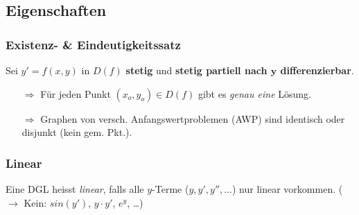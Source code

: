 \subsection{Eigenschaften}
    \subsubsection{Existenz- \& Eindeutigkeitssatz}
        Sei $y' = f(x,y)$ in $D(f)$ \textbf{stetig} und \textbf{stetig partiell nach $\boldsymbol{y}$ differenzierbar}.
        \begin{itemize}
            \item[$\Rightarrow$] Für jeden Punkt $(x_o,y_o) \in D(f)$ gibt es \textit{genau eine} Lösung. 
            \item[$\Rightarrow$] Graphen von versch. Anfangswertproblemen (AWP) sind identisch oder disjunkt (kein gem. Pkt.).
        \end{itemize}
    \subsubsection{Linear}
        Eine DGL heisst \textit{linear}, falls alle $y$-Terme ($y, y', y'', \dots$) nur linear vorkommen.
        ($\to$ Kein: $sin(y')$, $y\cdot y'$, $e^y$, \dots)

